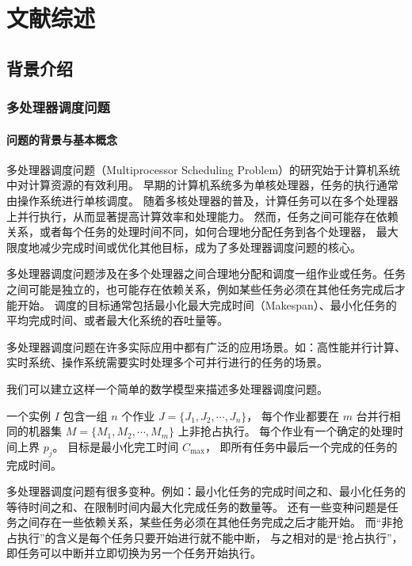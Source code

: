 \cleardoublepage
\newrefsection
\chapter{文献综述}

\section{背景介绍}

\subsection{多处理器调度问题}

\subsubsection{问题的背景与基本概念}

多处理器调度问题（Multiprocessor Scheduling Problem）的研究始于计算机系统中对计算资源的有效利用。
早期的计算机系统多为单核处理器，任务的执行通常由操作系统进行单核调度。
随着多核处理器的普及，计算任务可以在多个处理器上并行执行，从而显著提高计算效率和处理能力。
然而，任务之间可能存在依赖关系，或者每个任务的处理时间不同，如何合理地分配任务到各个处理器，
最大限度地减少完成时间或优化其他目标，成为了多处理器调度问题的核心。

多处理器调度问题涉及在多个处理器之间合理地分配和调度一组作业或任务。任务之间可能是独立的，也可能存在依赖关系，例如某些任务必须在其他任务完成后才能开始。
调度的目标通常包括最小化最大完成时间（Makespan）、最小化任务的平均完成时间、或者最大化系统的吞吐量等。

多处理器调度问题在许多实际应用中都有广泛的应用场景。如：高性能并行计算、实时系统、操作系统需要实时处理多个可并行进行的任务的场景。

我们可以建立这样一个简单的数学模型来描述多处理器调度问题。

\begin{defi}[朴素多处理器调度问题]
    一个实例 $I$ 包含一组 $n$ 个作业 $J = \{J_1, J_2, \cdots, J_n\}$，
    每个作业都要在 $m$ 台并行相同的机器集 $M = \{M_1, M_2, \cdots, M_m\}$ 上非抢占执行。
    每个作业有一个确定的处理时间上界 $p_j$。
    目标是最小化完工时间 $C_{\text{max}}$，
    即所有任务中最后一个完成的任务的完成时间。
\end{defi}

多处理器调度问题有很多变种。例如：最小化任务的完成时间之和、最小化任务的等待时间之和、在限制时间内最大化完成任务的数量等。
还有一些变种问题是任务之间存在一些依赖关系，某些任务必须在其他任务完成之后才能开始。
而“非抢占执行”的含义是每个任务只要开始进行就不能中断，
与之相对的是“抢占执行”，即任务可以中断并立即切换为另一个任务开始执行。

